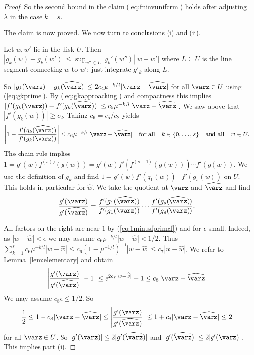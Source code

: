 \documentclass[12pt,oneside,a4]{amsart}
\numberwithin{maincounter}{section}
\numberwithin{equation}{section}
\renewcommand{\subset}{\subseteq}
\begin{document}
\begin{proof}
  So the second bound in the claim (\ref{eq:fninvuniform}) holds after
  adjusting $\lambda$ in the case $k=s$.

  The claim is now proved. We now turn to conclusions (i) and (ii). 

  Let $w,w'$ lie in the disk $U$. 
  Then $|g_k(w)-g_k(w')| \le \sup_{w''\in L} |g_k'(w'')|
  |w- w'|$ where $L\subset U$ is the line segment connecting
  $w$ to $w'$; just integrate $g'_k$ along $L$. 

  So $|g_k(\varz)-g_k(\widehat{\varz})|\le 2c_4
  \mu^{-k/l} |\varz- \widehat{\varz}|$ for all $\varz\in U$
  using (\ref{eq:gkprime}). 
  By (\ref{eq:gkapproaching}) and compactness this implies
  $|f'(g_k(\varz))-f'(g_k( \widehat{\varz}))| \le c_5 \mu^{-k/l}|\varz- \widehat{\varz}|$.
  We saw above that $|f'(g_k(w))|\ge c_2$. Taking $c_6=c_5/c_2$ yields
  \begin{equation}
    \label{eq:1minusfprimef}
    \left|1-\frac{f'(g_k( \widehat{\varz}))}{f'(g_k(\varz))}\right|\le c_6
    \mu^{-k/l}|\varz- \widehat{\varz}|\quad\text{for all}\quad k\in
    \{0,\ldots,s\}\quad\text{and all}\quad w\in U.
  \end{equation}
  The chain rule implies $1 = g'(w) {f^{(s)}}'(g(w)) = g'(w)
  f'(f^{(s-1)}(g(w)))\cdots f'(g(w))$. We use the
  definition of $g_k$ and find
  $1 = g'(w)f'(g_1(w)) \cdots f'(g_s(w))$ on $U$.
  This holds in particular for $\widehat w$.
  We take the
  quotient at $\varz$ and $ \widehat{\varz}$ and find  
  \begin{equation*}
    \frac{g'(\varz)}{g'( \widehat{\varz})} = \frac{f'(g_1( \widehat{\varz}))}{f'(g_1(\varz))} \cdots \frac{f'(g_s( \widehat{\varz}))}{f'(g_s(\varz))}.
  \end{equation*}

  All factors on the right are near $1$ by   (\ref{eq:1minusfprimef})
  and for $\epsilon$ small.
  Indeed, as $|w-\widehat w |<\epsilon$ we may assume
  $c_6\mu^{-k/l}|w-\widehat w|< 1/2$.
  Thus $\sum_{k=1}^{s} c_6\mu^{-k/l}|w-\widehat w|
  \le {c_6}(1-\mu^{-1/l})^{-1}|w-\widehat w|\le c_7 |w-\widehat w|$. We
  refer to Lemma~\ref{lem:elementary} and obtain
  \begin{equation*}
    \left|\left|\frac{g'(\varz)}{g'( \widehat{\varz})}\right|-1\right|
    \le e^{2c_7|w-\widehat w|}-1\le c_8|\varz- \widehat{\varz}|.
  \end{equation*}
  We may assume $c_8\epsilon \le 1/2$.
  So 
  $$\frac 12 \le 1-c_8|\varz-\widehat{\varz}|\le
  \left|\frac{g'(\varz)}{g'(\widehat{\varz})}\right| \le
  1+c_8|\varz-\widehat{\varz}|\le 2$$
  for all $\varz\in U$.
  So $|g'(\varz)|\le 2  |g'(\widehat{\varz})|$ and
  $|g'(\widehat\varz)|\le 2 |g'({\varz})|$.
  This implies part (i).


\end{proof}
\end{document}
